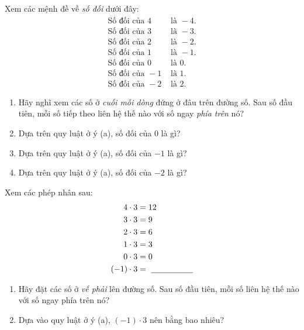 \begin{problem}[1.16]
Xem các mệnh đề về \emph{số đối} dưới đây:
\[
\begin{aligned}
\text{Số đối của }4 &\text{ là } -4.\\
\text{Số đối của }3 &\text{ là } -3.\\
\text{Số đối của }2 &\text{ là } -2.\\
\text{Số đối của }1 &\text{ là } -1.\\
\text{Số đối của }0 &\text{ là } 0.\\
\text{Số đối của }-1 &\text{ là } 1.\\
\text{Số đối của }-2 &\text{ là } 2.
\end{aligned}
\]

\begin{enumerate}[label=(\alph*)]
  \item Hãy nghĩ xem các số ở \emph{cuối mỗi dòng} đứng ở đâu trên
        đường số. Sau số đầu tiên, mỗi số tiếp theo liên hệ thế nào với
        số ngay \emph{phía trên} nó?
  \item Dựa trên quy luật ở ý (a), số đối của \(0\) là gì?
  \item Dựa trên quy luật ở ý (a), số đối của \(-1\) là gì?
  \item Dựa trên quy luật ở ý (a), số đối của \(-2\) là gì?
\end{enumerate}


\begin{problem}[1.17]
Xem các phép nhân sau:
\[
\begin{aligned}
4\cdot3 &= 12\\
3\cdot3 &= 9\\
2\cdot3 &= 6\\
1\cdot3 &= 3\\
0\cdot3 &= 0\\
(-1)\cdot3 &=\ \underline{\hspace{1.8cm}}
\end{aligned}
\]
\begin{enumerate}[label=(\alph*)]
  \item Hãy đặt các số ở \emph{vế phải} lên đường số. Sau số đầu tiên,
        mỗi số liên hệ thế nào với số ngay phía trên nó?
  \item Dựa vào quy luật ở ý (a), \((-1)\cdot3\) nên bằng bao nhiêu?
\end{enumerate}
\end{problem}


\end{problem}

